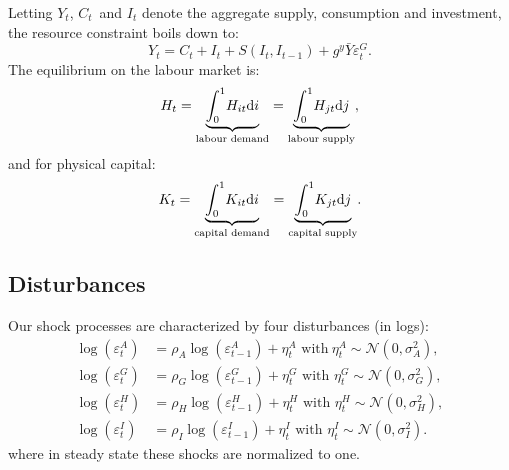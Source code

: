 \documentclass[a4paper,12pt]{article}%
\begin{document}
Letting $Y_{t}$, $C_{t}$\ and $I_{t}$ denote the aggregate supply, consumption
and investment, the resource constraint boils down to:\
\begin{equation}
Y_{t}=C_{t}+I_{t}+S\left(  I_{t},I_{t-1}\right)  +g^{y}\bar{Y}\varepsilon
_{t}^{G}.
\end{equation}
The equilibrium on the labour market is:%
\begin{equation}
H_{t}=\underset{\text{labour demand}}{\underbrace{%
{\displaystyle\int\nolimits_{0}^{1}}
H_{it}\text{d}i}}=\underset{\text{labour supply}}{\underbrace{%
{\displaystyle\int\nolimits_{0}^{1}}
H_{jt}\text{d}j}},
\end{equation}
and for physical capital:%
\begin{equation}
K_{t}=\underset{\text{capital demand}}{\underbrace{%
{\displaystyle\int\nolimits_{0}^{1}}
K_{it}\text{d}i}}=\underset{\text{capital supply}}{\underbrace{%
{\displaystyle\int\nolimits_{0}^{1}}
K_{jt}\text{d}j}}.
\end{equation}


\subsection{Disturbances}

Our shock processes are characterized by four disturbances (in logs):%
\begin{align}
\log\left(  \varepsilon_{t}^{A}\right)   &  =\rho_{A}\log\left(
\varepsilon_{t-1}^{A}\right)  +\eta_{t}^{A}\text{ \ \ with}\ \eta_{t}^{A}%
\sim\mathcal{N}\left(  0,\sigma_{A}^{2}\right)  ,\\
\log\left(  \varepsilon_{t}^{G}\right)   &  =\rho_{G}\log\left(
\varepsilon_{t-1}^{G}\right)  +\eta_{t}^{G}\text{ with }\eta_{t}^{G}%
\sim\mathcal{N}\left(  0,\sigma_{G}^{2}\right)  ,\\
\log\left(  \varepsilon_{t}^{H}\right)   &  =\rho_{H}\log\left(
\varepsilon_{t-1}^{H}\right)  +\eta_{t}^{H}\text{ with }\eta_{t}^{H}%
\sim\mathcal{N}\left(  0,\sigma_{H}^{2}\right)  ,\\
\log\left(  \varepsilon_{t}^{I}\right)   &  =\rho_{I}\log\left(
\varepsilon_{t-1}^{I}\right)  +\eta_{t}^{I}\text{ with }\eta_{t}^{I}%
\sim\mathcal{N}\left(  0,\sigma_{I}^{2}\right)  .
\end{align}
where in steady state these shocks are normalized to one.
\end{document}
